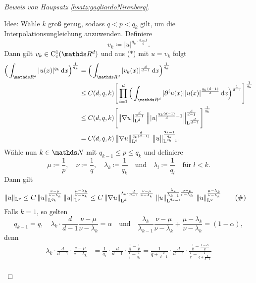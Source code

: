 \begin{proof}[Beweis von Haupsatz \ref{hsatz:gagliardoNirenberg}]
\begin{enumerate}
      Idee: Wähle $k$ groß genug, sodass $q < p < q_k$ gilt, um die Interpolationsungleichung anzuwenden.
      Definiere
      $$
      v_k \coloneqq |u|^{q_k \cdot \frac{d - 1}{d}}.
      $$
      Dann gilt $v_k \in \CC_{\cc}^1(\R^d)$ und aus ($\ast$) mit $u = v_k$ folgt
      \begin{align*}
        \Big( \int_{\R^d} |u(x)|^{q_k} \d x \Big)^{\frac{1}{q_k}}
        &= \Big( \int_{\R^d} |v_k(x)|^{\frac{d}{d - 1}} \d x \Big)^{\frac{1}{q_k}} \\
        &\leq C(d,q,k) \Bigg[ \prod_{i = 1}^d \Big( \int_{\R^d} |\partial^i u(x)||u(x)|^{\frac{q_k(d - 1)}{d }} \d x \Big)^{\frac{1}{d - 1}} \Bigg]^{\frac{1}{q_k}} \\
        &\leq C(d,q,k) \Bigg[ \big\|\nabla u\big\|_{\Ell^d}^{\frac{d}{d - 1 }} \; \Big\| |u|^{\frac{q_k (d - 1)}{d} - 1} \Big\|_{\Ell^{\frac{d}{d - 1}}}^{\frac{d}{d - 1}} \Bigg]^{\frac{1}{q_k}} \\
        &= C(d,q,k) \, \big\|\nabla u\big\|_{\Ell^d}^{\frac{d}{q_k (d - 1)}} \; \big\|u\big\|_{\Ell^{q_{k - 1}}}^{\frac{q_{k - 1}}{q_k}}.
      \end{align*}
      Wähle nun $k \in \N$ mit $q_{k - 1} \leq p \leq q_k$ und definiere 
      $$
      \mu \coloneqq \frac{1}{p}, \quad \nu \coloneqq \frac{1}{q}, \quad \lambda_k \coloneqq \frac{1}{q_k} \quad\text{und}\quad \lambda_l \coloneqq \frac{1}{q_l} \quad\text{für } l < k.
      $$
      Dann gilt
      \begin{align*}
        \|u\|_{\mathrm{L}^p}
        &\leq C \, \|u\|_{\mathrm{L}^{q_k}}^{\frac{\nu - \mu}{\nu - \lambda_k}} \, \|u\|_{\mathrm{L}^q}^{\frac{\mu - \lambda_k}{\nu - \lambda_k}} 
        \leq C \, \|\nabla u\|_{\mathrm{L}^d}^{\lambda_k \cdot \frac{d}{d - 1} \, \frac{\nu - \mu}{\nu - \lambda_k}} \; \|u\|_{\mathrm{L}^{q_{k - 1}}}^{\frac{\lambda_k}{\lambda_{k - 1}} \frac{\nu - \mu}{\nu - \lambda_k}}  \; \|u\|_{\mathrm{L}^{q}}^{\frac{\mu - \lambda_k}{\nu - \lambda_k}}  \tag{\#}
      \end{align*}
      Falls $k = 1$, so gelten 
      $$
      q_{k - 1} = q, \quad \lambda_k \cdot \frac{d}{d - 1}\frac{\nu - \mu}{\nu - \lambda_k} = \alpha \quad\text{und}\quad \frac{\lambda_k}{\lambda_{k - 1}} \frac{\nu - \mu}{\nu - \lambda_k} + \frac{\mu - \lambda_k}{\nu - \lambda_k}=  (1 - \alpha),
      $$
      denn
      \begin{align*}
      \lambda_k \cdot \frac{d}{d - 1} \cdot \frac{\nu - \mu}{\nu - \lambda_k}
        &= \frac{1}{q_1} \cdot \frac{d}{d - 1} \cdot \frac{\frac{1}{q} - \frac{1}{p}}{\frac{1}{q} - \frac{1}{q_1}} 
        = \frac{1}{q + \frac{d}{d - 1}} \cdot \frac{d}{d - 1} \cdot \frac{\frac{1}{q} - \frac{1 - \alpha}{q}}{\frac{1}{q} - \frac{1}{q + \frac{d}{d - 1}}}  \\

\end{align*}
\end{enumerate}
\end{proof}
